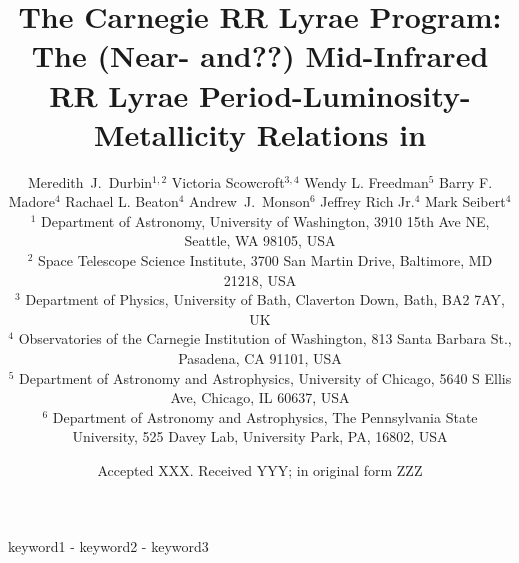 \documentclass[a4paper,fleqn,usenatbib]{mnras}
\title[Mid-IR RRL PLZ Relations in $\omega$ Cen]{The Carnegie RR Lyrae Program: The (Near- and??) Mid-Infrared RR Lyrae Period-Luminosity-Metallicity Relations in \ocen}
\author[M.~J.~Durbin et al.]{Meredith~J.~Durbin$^{1,2}$
Victoria Scowcroft$^{3,4}$
Wendy L. Freedman$^{5}$
Barry F. Madore$^{4}$
\newauthor Rachael L. Beaton$^{4}$
Andrew~J.~Monson$^{6}$
Jeffrey Rich Jr.$^{4}$
Mark Seibert$^{4}$
\\
$^1$ Department of Astronomy, University of Washington, 3910 15th Ave NE, Seattle, WA 98105, USA \\
$^2$ Space Telescope Science Institute, 3700 San Martin Drive, Baltimore, MD 21218, USA \\
$^3$ Department of Physics, University of Bath, Claverton Down, Bath, BA2 7AY, UK \\
$^4$ Observatories of the Carnegie Institution of Washington, 813 Santa Barbara St., Pasadena, CA 91101, USA \\
$^5$ Department of Astronomy and Astrophysics, University of Chicago, 5640 S Ellis Ave, Chicago, IL 60637, USA \\
$^{6}$ Department of Astronomy and Astrophysics, The Pennsylvania State University, 525 Davey Lab, University Park, PA, 16802, USA \\
}
\date{Accepted XXX. Received YYY; in original form ZZZ}
\providecommand{\mjdcomment}[1]{{\textcolor{red}{{MJD: #1}}}\xspace}
\begin{document}
\label{firstpage}
\pagerange{\pageref{firstpage}-\pageref{lastpage}}
\maketitle

\begin{abstract}
\end{abstract}

\begin{keywords}
keyword1 - keyword2 - keyword3
\end{keywords}









\end{document}

